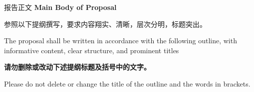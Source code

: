 {\sanhao {} 报\quad 告\quad 正\quad 文 
\bfseries {} Main Body of Proposal}

{\sihao \kaishu  
参照以下提纲撰写，要求内容翔实、清晰，层次分明，标题突出。}

{\sihao {} The proposal shall be written in accordance 
with the following outline, with informative content, clear structure, 
and prominent titles}

{\sihao \kaishu \color{MsBlue} \bfseries 请勿删除或改动下述提纲标题及括号中的文字。}

{\sihao \color{MsBlue}  Please do not delete or 
change the title of the outline and the words in brackets.}

